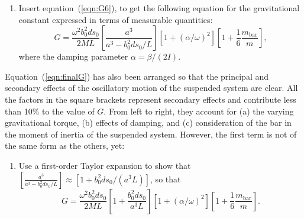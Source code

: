 \documentclass{article}
\begin{document}
\begin{enumerate}[resume]
\item Insert equation~(\ref{eqn:G6}), to get the following equation for
  the gravitational constant expressed in terms of measurable
  quantities:%
  \begin{equation}
    G=\frac{\omega^{2}b_0^{2}ds_{0}}{2ML}\left[ 
      \frac{a^{3}}{a^{3}-b_0^{2}ds_{0}/L}\right]  
  \left[1+\left(\alpha/\omega\right)^2\right]  
  \left[  1+\frac{1}{6}\frac{m_{\mathrm{bar}}}{m}\right],
  \label{eqn:finalG}%
\end{equation}
where the damping parameter $\alpha =\beta/(2I)$.
\end{enumerate}
Equation~(\ref{eqn:finalG}) has also been arranged so that the
principal and secondary effects of the oscillatory motion of the
suspended system are clear. All the factors in the square brackets
represent secondary effects and contribute less than 10\% to the value
of $G$. From left to right, they account for (a) the varying
gravitational torque, (b) effects of damping, and (c) consideration of
the bar in the moment of inertia of the suspended system. However, the
first term is not of the same form as the others, yet: 
\begin{enumerate}[resume]
\item Use a first-order Taylor expansion \cite[e.g., Section 3.1
  in][]{SniederVanWijk15} to show that $\left[
    \frac{a^{3}}{a^{3}-b_0^{2}ds_{0}/L}\right] \approx
  [1+b_0^{2}ds_{0}/(a^3L)]$, so that
  \begin{equation}
    G=\frac{\omega^{2}b_0^{2}ds_{0}}{2ML}\left[ 1+\frac{b_0^{2}ds_{0}}{a^3L}\right]  
    \left[1+\left(\alpha/\omega\right)^2\right]
    \left[  1+\frac{1}{6}\frac{m_{\mathrm{bar}}}{m}\right].
    \label{eqn:finalG2}%
  \end{equation}
\end{enumerate}
\end{document}
